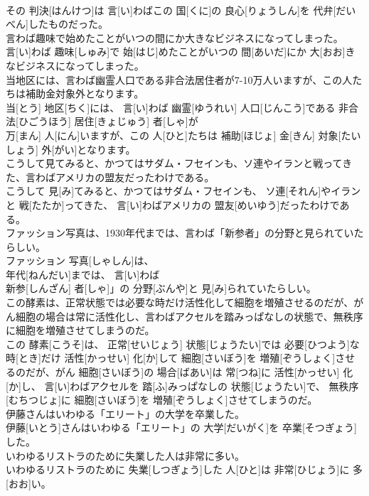 \documentclass[8pt]{extreport}
\begin{document}
\begin{CJK}{UTF8}{min}
\\	その 判決[はんけつ]は 言[い]わばこの 国[くに]の 良心[りょうしん]を 代弁[だいべん]したものだった。
\\	言わば趣味で始めたことがいつの間にか大きなビジネスになってしまった。	
\\	言[い]わば 趣味[しゅみ]で 始[はじ]めたことがいつの 間[あいだ]にか 大[おお]きなビジネスになってしまった。
\\	当地区には、言わば幽霊人口である非合法居住者が7-10万人いますが、この人たちは補助金対象外となります。	
\\	当[とう] 地区[ちく]には、 言[い]わば 幽霊[ゆうれい] 人口[じんこう]である 非合法[ひごうほう] 居住[きょじゅう] 者[しゃ]が 
\\	万[まん] 人[にん]いますが、この 人[ひと]たちは 補助[ほじょ] 金[きん] 対象[たいしょう] 外[がい]となります。
\\	こうして見てみると、かつてはサダム・フセインも、ソ連やイランと戦ってきた、言わばアメリカの盟友だったわけである。	
\\	こうして 見[み]てみると、かつてはサダム・フセインも、 ソ連[それん]やイランと 戦[たたか]ってきた、 言[い]わばアメリカの 盟友[めいゆう]だったわけである。
\\	ファッション写真は、1930年代までは、言わば「新参者」の分野と見られていたらしい。	
\\	ファッション 写真[しゃしん]は、 
\\	年代[ねんだい]までは、 言[い]わば
\\	新参[しんざん] 者[しゃ]」の 分野[ぶんや]と 見[み]られていたらしい。
\\	この酵素は、正常状態では必要な時だけ活性化して細胞を増殖させるのだが、がん細胞の場合は常に活性化し、言わばアクセルを踏みっぱなしの状態で、無秩序に細胞を増殖させてしまうのだ。	
\\	この 酵素[こうそ]は、 正常[せいじょう] 状態[じょうたい]では 必要[ひつよう]な 時[とき]だけ 活性[かっせい] 化[か]して 細胞[さいぼう]を 増殖[ぞうしょく]させるのだが、がん 細胞[さいぼう]の 場合[ばあい]は 常[つね]に 活性[かっせい] 化[か]し、 言[い]わばアクセルを 踏[ふ]みっぱなしの 状態[じょうたい]で、 無秩序[むちつじょ]に 細胞[さいぼう]を 増殖[ぞうしょく]させてしまうのだ。
\\	伊藤さんはいわゆる「エリート」の大学を卒業した。	
\\	伊藤[いとう]さんはいわゆる「エリート」の 大学[だいがく]を 卒業[そつぎょう]した。
\\	いわゆるリストラのために失業した人は非常に多い。	
\\	いわゆるリストラのために 失業[しつぎょう]した 人[ひと]は 非常[ひじょう]に 多[おお]い。

\end{CJK}
\end{document}
